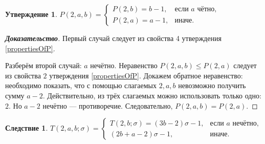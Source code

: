\documentclass[12pt]{article}
\newtheorem{proposition}[theorem]{Утверждение}
\newtheorem{corollary}[theorem]{Следствие}
\begin{document}
\begin{proposition}
$P(2, a, b) = \begin{cases}
P(2, b) = b - 1, &\text{если $a$ чётно,} \\
P(2, a) = a - 1,&\text{иначе.}
\end{cases}$
\end{proposition}
\begin{proof}[\textbf{Доказательство}]
Первый случай следует из свойства 4 утверждения \ref{propertiesOfP}.

Разберём второй случай: $a$ нечётно. Неравенство $P(2, a, b) \le P(2, a)$ следует из свойства $2$ утверждения \ref{propertiesOfP}. Докажем обратное неравенство: необходимо показать, что с помощью слагаемых $2, a, b$ невозможно получить сумму $a - 2$. Действительно, из трёх слагаемых можно использовать только одно: $2$. Но $a - 2$ нечётно --- противоречие. Следовательно, $P(2, a, b) = P(2, a)$.
\end{proof}

\begin{corollary}
$T(2, a, b; \sigma) = \begin{cases}
T(2, b; \sigma) = (3b - 2)\sigma - 1, &\text{если $a$ нечётно,} \\
(2b + a - 2)\sigma - 1, &\text{иначе.}
\end{cases}$
\end{corollary}
\end{document}
